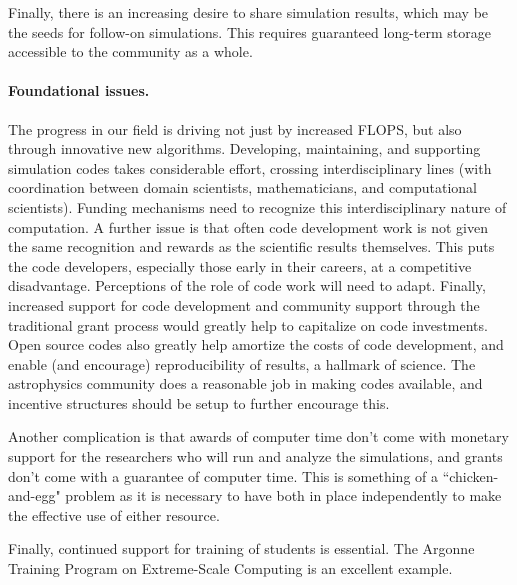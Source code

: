\documentclass[11pt,twocolumn]{article}
\begin{document}
Finally, there is an increasing desire to share simulation results,
which may be the seeds for follow-on simulations.  This
requires guaranteed long-term storage accessible to the community as a
whole.

\paragraph*{Foundational issues.}

The progress in our field is driving not just by increased FLOPS, but
also through innovative new algorithms.  Developing, maintaining, and
supporting simulation codes takes considerable effort, crossing
interdisciplinary lines (with coordination between domain scientists,
mathematicians, and computational scientists).  Funding mechanisms
need to recognize this interdisciplinary nature of computation.  A
further issue is that often code development work is not given the
same recognition and rewards as the scientific results themselves.
This puts the code developers, especially those early in their
careers, at a competitive disadvantage.  Perceptions of the role of
code work will need to adapt.  Finally, increased support for code
development and community support through the traditional grant
process would greatly help to capitalize on code investments.  Open
source codes also greatly help amortize the costs of code development,
and enable (and encourage) reproducibility of results, a hallmark of
science.  The astrophysics community does a reasonable job in making
codes available, and incentive structures should be setup to further
encourage this.

Another complication is that awards of computer time don't come with
monetary support for the researchers who will run and analyze the
simulations, and grants don't come with a guarantee of computer time.
This is something of a ``chicken-and-egg" problem as it is necessary
to have both in place independently to make the effective use of 
either resource.

Finally, continued support for training of students is essential. The
Argonne Training Program on Extreme-Scale Computing is an excellent
example.
\end{document}
